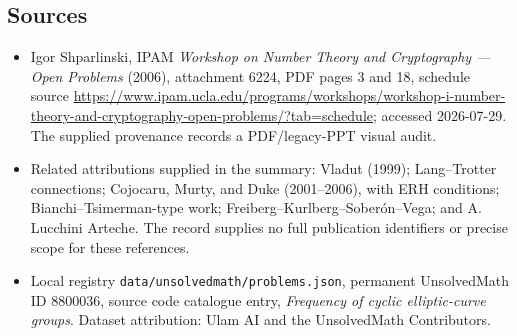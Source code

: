 \documentclass[11pt]{article}
\begin{document}
\subsection{Sources}
\begin{itemize}
\item Igor Shparlinski, IPAM \emph{Workshop on Number Theory and Cryptography --- Open Problems} (2006), attachment 6224, PDF pages 3 and 18, schedule source \url{https://www.ipam.ucla.edu/programs/workshops/workshop-i-number-theory-and-cryptography-open-problems/?tab=schedule}; accessed 2026-07-29. The supplied provenance records a PDF/legacy-PPT visual audit.
\item Related attributions supplied in the summary: Vladut (1999); Lang--Trotter connections; Cojocaru, Murty, and Duke (2001--2006), with ERH conditions; Bianchi--Tsimerman-type work; Freiberg--Kurlberg--Sober\'on--Vega; and A. Lucchini Arteche. The record supplies no full publication identifiers or precise scope for these references.
\item Local registry \texttt{data/unsolvedmath/problems.json}, permanent UnsolvedMath ID $8800036$, source code catalogue entry, \emph{Frequency of cyclic elliptic-curve groups}. Dataset attribution: Ulam AI and the UnsolvedMath Contributors.
\end{itemize}
\end{document}
